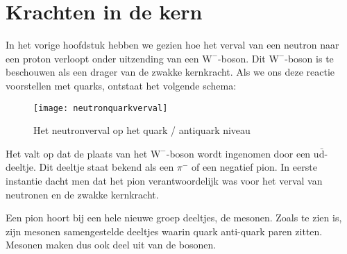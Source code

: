 \section{Krachten in de kern}

In het vorige hoofdstuk hebben we gezien hoe het verval van een neutron
naar een proton verloopt onder uitzending van een $\mathrm{W}^{-}$-boson.
Dit $\mathrm{W}^{-}$-boson is te beschouwen als een drager van de
zwakke kernkracht. Als we ons deze reactie voorstellen met quarks,
ontstaat het volgende schema:

\begin{figure}[h]
\noindent \begin{centering}
\texttt{[image: neutronquarkverval]}
\par\end{centering}

\caption{\label{fig:Het-neutronverval-op}Het neutronverval op het quark /
antiquark niveau}
\end{figure}


Het valt op dat de plaats van het $\mathrm{W}^{-}$-boson wordt ingenomen
door een $\mathrm{u\bar{d}}$-deeltje. Dit deeltje staat bekend als
een $\pi^{-}$ of een negatief pion. In eerste instantie dacht men
dat het pion verantwoordelijk was voor het verval van neutronen en
de zwakke kernkracht.

Een pion hoort bij een hele nieuwe groep deeltjes, de mesonen. Zoals
te zien is, zijn mesonen samengestelde deeltjes waarin quark anti-quark
paren zitten. Mesonen maken dus ook deel uit van de bosonen.

